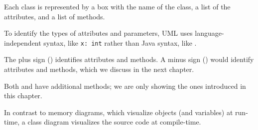 Each class is represented by a box with the name of the class,
a list of the attributes, and a list of methods.


To identify the types of attributes and parameters, UML uses language-independent syntax, like {\tt x:~int} rather than Java syntax, like
.

The plus sign (\java{+}) identifies  attributes and methods.
A minus sign (\java{-}) would identify  attributes and methods, which we discuss in the next chapter.

Both  and  have additional methods; we are only showing the ones introduced in this chapter.

In contrast to memory diagrams, which visualize objects (and variables) at run-time, a class diagram visualizes the source code at compile-time.


%
%
%
%
%
%
%
%
%


